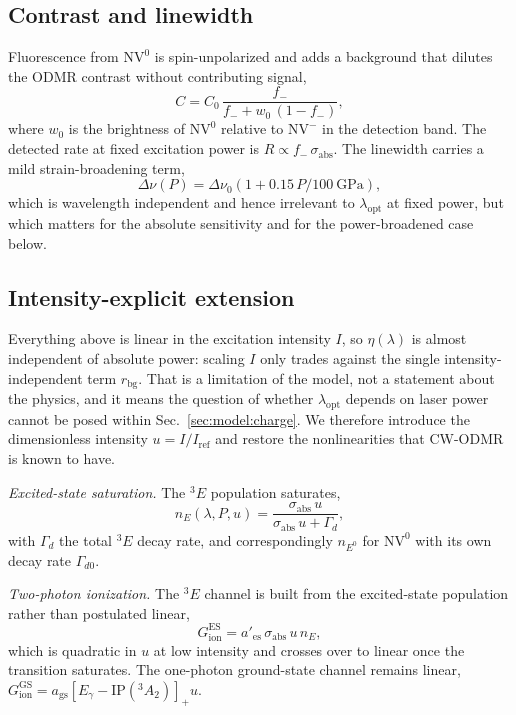 \documentclass[preprint,12pt]{elsarticle}
\newcommand{\NVm}{\ensuremath{\mathrm{NV}^{-}}}
\newcommand{\NVz}{\ensuremath{\mathrm{NV}^{0}}}
\newcommand{\gsA}{\ensuremath{^{3}\!A_{2}}}
\newcommand{\esE}{\ensuremath{^{3}\!E}}
\newcommand{\sabs}{\ensuremath{\sigma_{\mathrm{abs}}}}
\newcommand{\fm}{\ensuremath{f_{-}}}
\newcommand{\lopt}{\ensuremath{\lambda_{\mathrm{opt}}}}
\begin{document}
\subsection{Contrast and linewidth}
\label{sec:model:contrast}

Fluorescence from \NVz{} is spin-unpolarized and adds a background that dilutes
the ODMR contrast without contributing signal,
\begin{equation}
  C = C_0\,\frac{\fm}{\fm + w_0\,(1-\fm)},
  \label{eq:contrast}
\end{equation}
where $w_0$ is the brightness of \NVz{} relative to \NVm{} in the detection band.
The detected rate at fixed excitation power is $R \propto \fm\,\sabs$. The
linewidth carries a mild strain-broadening term,
\begin{equation}
  \Delta\nu(P) = \Delta\nu_0\left(1 + 0.15\,P/\SI{100}{\giga\pascal}\right),
\end{equation}
which is wavelength independent and hence irrelevant to $\lopt$ at fixed power,
but which matters for the absolute sensitivity and for the power-broadened case
below.

\subsection{Intensity-explicit extension}
\label{sec:model:power}

Everything above is linear in the excitation intensity $I$, so $\eta(\lambda)$ is
almost independent of absolute power: scaling $I$ only trades against the single
intensity-independent term $r_{\mathrm{bg}}$. That is a limitation of the model,
not a statement about the physics, and it means the question of whether $\lopt$
depends on laser power cannot be posed within Sec.~\ref{sec:model:charge}. We
therefore introduce the dimensionless intensity $u = I/I_{\mathrm{ref}}$ and
restore the nonlinearities that CW-ODMR is known to have.

\emph{Excited-state saturation.} The \esE{} population saturates,
\begin{equation}
  n_E(\lambda,P,u) = \frac{\sabs\,u}{\sabs\,u + \Gamma_d} ,
\end{equation}
with $\Gamma_d$ the total \esE{} decay rate, and correspondingly $n_{E^0}$ for
\NVz{} with its own decay rate $\Gamma_{d0}$.

\emph{Two-photon ionization.} The \esE{} channel is built from the excited-state
population rather than postulated linear,
\begin{equation}
  G_{\mathrm{ion}}^{\mathrm{ES}} = a'_{\mathrm{es}}\,\sabs\,u\,n_E ,
\end{equation}
which is quadratic in $u$ at low intensity and crosses over to linear once the
transition saturates. The one-photon ground-state channel remains linear,
$G_{\mathrm{ion}}^{\mathrm{GS}} = a_{\mathrm{gs}}[E_\gamma-\mathrm{IP}(\gsA)]_{+}u$.
\end{document}
